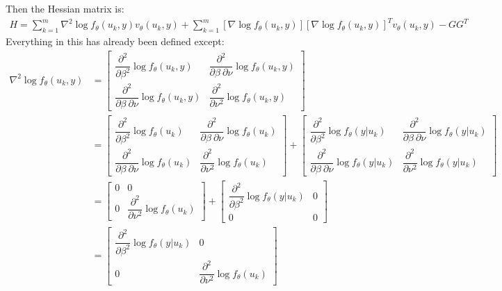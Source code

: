 \documentclass{article}
\begin{document}
Then the Hessian matrix is: \\
\begin{align}
H = \sum_{k=1}^m \nabla^2 \log f_\theta (u_k,y) v_\theta(u_k,y) +  \sum_{k=1}^m \left[ \nabla  \log f_\theta (u_k,y)  \right] \left[ \nabla  \log f_\theta (u_k,y)  \right]^T  v_\theta(u_k,y) -G G^T
\end{align}
Everything in this has already been defined except:
\begin{align}
\nabla^2 \log f_\theta (u_k,y) &=  \begin{bmatrix} \dfrac{\partial^2}{\partial \beta^2} \log f_\theta (u_k,y) & \dfrac{\partial^2}{\partial \beta \: \partial \nu} \log f_\theta (u_k,y) \\ \dfrac{\partial^2}{\partial \beta \: \partial \nu} \log f_\theta (u_k,y)  & \dfrac{\partial^2}{ \partial \nu^2} \log f_\theta (u_k,y)  \end{bmatrix} \\
&= \begin{bmatrix} \dfrac{\partial^2}{\partial \beta^2} \log f_\theta (u_k) & \dfrac{\partial^2}{\partial \beta \: \partial \nu} \log f_\theta (u_k) \\ \dfrac{\partial^2}{\partial \beta \: \partial \nu} \log f_\theta (u_k)  & \dfrac{\partial^2}{ \partial \nu^2} \log f_\theta (u_k)  \end{bmatrix} + 
\begin{bmatrix} \dfrac{\partial^2}{\partial \beta^2} \log f_\theta (y|u_k) & \dfrac{\partial^2}{\partial \beta \: \partial \nu} \log f_\theta (y|u_k) \\ \dfrac{\partial^2}{\partial \beta \: \partial \nu} \log f_\theta (y|u_k)  & \dfrac{\partial^2}{ \partial \nu^2} \log f_\theta (y|u_k)  \end{bmatrix} \\
&= \begin{bmatrix} 0 & 0 \\ 0  & \dfrac{\partial^2}{ \partial \nu^2} \log f_\theta (u_k)  \end{bmatrix} + 
\begin{bmatrix} \dfrac{\partial^2}{\partial \beta^2} \log f_\theta (y|u_k) & 0 \\ 0 & 0  \end{bmatrix} \\
&= \begin{bmatrix} \dfrac{\partial^2}{\partial \beta^2} \log f_\theta (y|u_k) & 0 \\ 0  & \dfrac{\partial^2}{ \partial \nu^2} \log f_\theta (u_k)  \end{bmatrix} 
\end{align}
\end{document}
